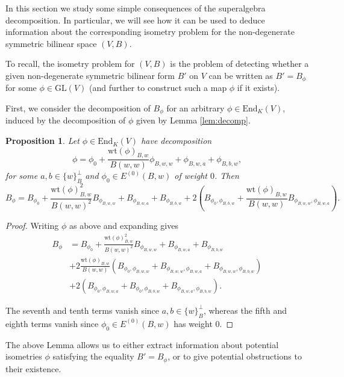 \documentclass{amsart}
\theoremstyle{plain}
\newtheorem{propn}[theorem]{Proposition}
\theoremstyle{definition}
\begin{document}
In this section we study some simple consequences of the superalgebra decomposition. In particular, we will see how it can be used to deduce information about the corresponding isometry problem for the non-degenerate symmetric bilinear space $(V,B)$. 

To recall, the isometry problem for $(V,B)$ is the problem of detecting whether a given non-degenerate symmetric bilinear form $B'$ on $V$ can be written as $B' = B_{\phi}$ for some $\phi\in\text{GL}(V)$ (and further to construct such a map $\phi$ if it exists).

First, we consider the decomposition of $B_{\phi}$ for an arbitrary $\phi\in\text{End}_K(V)$, induced by the decomposition of $\phi$ given by Lemma \ref{lem:decomp}.

\begin{propn}
\label{propn:expansion}
Let $\phi\in\text{End}_K(V)$ have decomposition \[\phi = \phi_0 + \frac{\text{wt}(\phi)_{B,w}}{B(w,w)}
\phi_{B,w,w}+ \phi_{B,w,a}+\phi_{B,b,w},\] for some $a,b\in\{w\}_B^{\perp}$ and $\phi_0\in E^{(0)}(B,w)$ of weight $0$. Then \[B_{\phi} = B_{\phi_0} + \frac{\text{wt}(\phi)_{B,w}^2}{B(w,w)^2} B_{\phi_{B,w,w}} + B_{
\phi_{B,w,a}} + B_{\phi_{B,b,w}} + 2\left(B_{\phi_0,\phi_{B,b,w}} + \frac{\text{wt}(\phi)_{B,w}}{B(w,w)}B_{\phi_{B,w,w},\phi_{B,w,a}}\right).\]
\end{propn}

\begin{proof}
Writing $\phi$ as above and expanding gives \begin{align*}B_{\phi} &= B_{\phi_0} + \frac{\text{wt}(\phi)_{B,w}^2}{B(w,w)^2} B_{\phi_{B,w,w}} + B_{\phi_{B,w,a}} + B_{\phi_{B,b,w}}\\ &+2\frac{\text{wt}(\phi)_{B,w}}{B(w,w)}( B_{\phi_0,\phi_{B,w,w}} + B_{\phi_{B,w,w},\phi_{B,w,a}}+B_{\phi_{B,w,w},\phi_{B,b,w}})\\ &+ 2(B_{\phi_0,\phi_{B,w,a}} + B_{\phi_0,\phi_{B,b,w}} + B_{\phi_{B,w,a},\phi_{B,b,w}}).\end{align*}

\noindent The seventh and tenth terms vanish since $a,b\in\{w\}_B^{\perp}$, whereas the fifth and eighth terms vanish since $\phi_0\in E^{(0)}(B,w)$ has weight $0$. \end{proof}

The above Lemma allows us to either extract information about potential isometries $\phi$ satisfying the equality $B' = B_{\phi}$, or to give potential obstructions to their existence.
\end{document}
